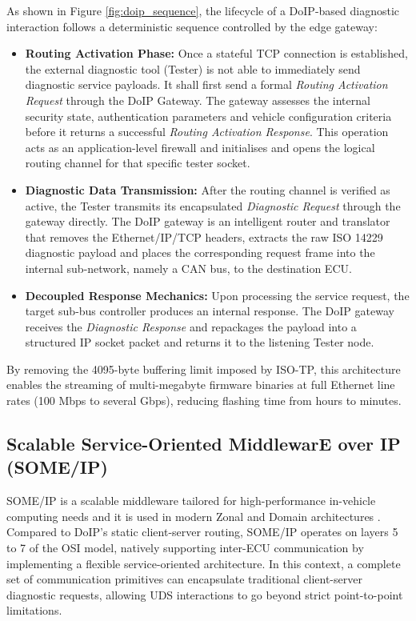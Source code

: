 As shown in Figure \ref{fig:doip_sequence}, the lifecycle of a \gls{DoIP}-based diagnostic interaction follows a deterministic sequence controlled by the edge gateway:
\begin{itemize}
    \item \textbf{Routing Activation Phase:} Once a stateful TCP connection is established, the external diagnostic tool (Tester) is not able to immediately send diagnostic service payloads. It shall first send a formal \textit{Routing Activation Request} through the \gls{DoIP} Gateway. The gateway assesses the internal security state, authentication parameters and vehicle configuration criteria before it returns a successful \textit{Routing Activation Response}. This operation acts as an application-level firewall and initialises and opens the logical routing channel for that specific tester socket.
    \item \textbf{Diagnostic Data Transmission:} After the routing channel is verified as active, the Tester transmits its encapsulated \textit{Diagnostic Request} through the gateway directly. The \gls{DoIP} gateway is an intelligent router and translator that removes the Ethernet/IP/TCP headers, extracts the raw ISO 14229 diagnostic payload and places the corresponding request frame into the internal sub-network, namely a CAN bus, to the destination \gls{ECU}.
    \item \textbf{Decoupled Response Mechanics:} Upon processing the service request, the target sub-bus controller produces an internal response. The \gls{DoIP} gateway receives the \textit{Diagnostic Response} and repackages the payload into a structured \gls{IP} socket packet and returns it to the listening Tester node.
\end{itemize}
By removing the 4095-byte buffering limit imposed by ISO-TP, this architecture enables the streaming of multi-megabyte firmware binaries at full Ethernet line rates (100 Mbps to several Gbps), reducing flashing time from hours to minutes.

\subsection{Scalable Service-Oriented MiddlewarE over IP (SOME/IP)}
\gls{SOME/IP} is a scalable middleware tailored for high-performance in-vehicle computing needs and it is used in modern Zonal and Domain architectures \cite{autosar_someip}. Compared to \gls{DoIP}'s static client-server routing, \gls{SOME/IP} operates on layers 5 to 7 of the \gls{OSI} model, natively supporting inter-\gls{ECU} communication by implementing a flexible service-oriented architecture. In this context, a complete set of communication primitives can encapsulate traditional client-server diagnostic requests, allowing UDS interactions to go beyond strict point-to-point limitations.

